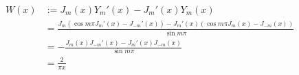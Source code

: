 \item

\begin{align*}
    W(x)
    &:= J_m(x) Y_m'(x) - J_m'(x) Y_m(x) \\
    &= \frac{
        J_m \left( \cos m\pi J_m'(x) - J_{-m}'(x) \right)
        - J_m'(x) \left( \cos m\pi J_m(x) - J_{-m}(x) \right)
    }{\sin m\pi} \\
    &= -\frac{J_m(x) J_{-m}'(x) - J_m'(x) J_{-m}(x)}{\sin m\pi} \\
    &= \frac{2}{\pi x}
\end{align*}
